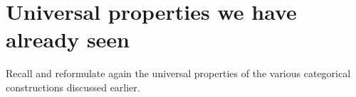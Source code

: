 
\section{Universal properties we have already seen}


Recall and reformulate again the universal properties of the various categorical constructions discussed earlier.
